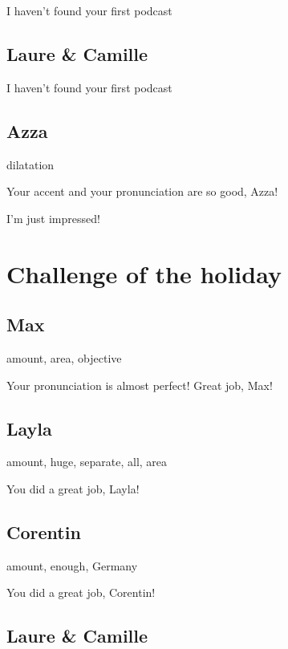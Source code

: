 \documentclass[12pt,oneside]{report}
\begin{document}
\begin{spacing}{1.2}
\color{blue}
I haven't found your first podcast
\color{black}


\subsection*{Laure \& Camille}

\color{blue}
I haven't found your first podcast
\color{black}


\subsection*{Azza}

dilatation

\color{blue}
Your accent and your pronunciation are so good, Azza!

I'm just impressed!
\color{black}



\section{Challenge of the holiday}

\subsection*{Max}

amount, area, objective

\color{blue}
Your pronunciation is almost perfect! Great job, Max!
\color{black}

\subsection*{Layla}

amount, huge, separate, all, area

\color{blue}
You did a great job, Layla!
\color{black}


\subsection*{Corentin}

amount, enough, Germany

You did a great job, Corentin!

\subsection*{Laure \& Camille}


\end{spacing}
\end{document}
